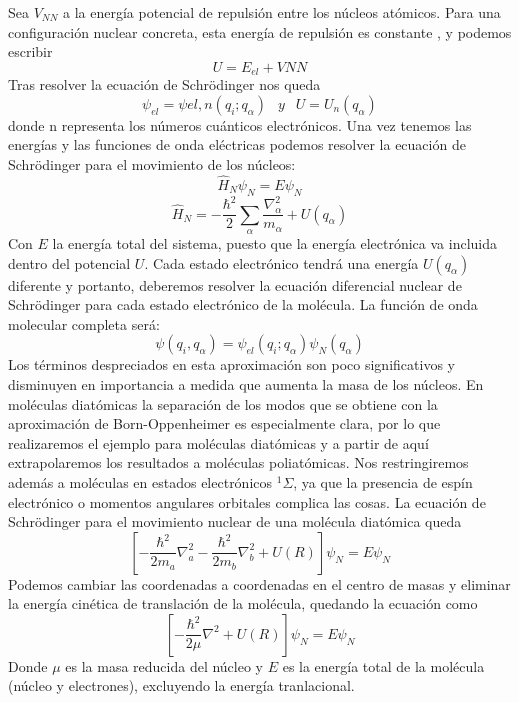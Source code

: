 \documentclass[a4paper]{article}
\begin{document}
Sea $V_{NN}$ a la energía potencial de repulsión entre los núcleos atómicos. Para una configuración nuclear concreta, esta energía de repulsión es constante , y podemos escribir 
\begin{equation}
U=E_{el}+V{NN}
\end{equation}
Tras resolver la ecuación de Schrödinger nos queda 
\begin{equation}
\psi_{el}=\psi{el,n}(q_i;q_\alpha)\,\ \,\ y \,\ \,\ U=U_n(q_\alpha)
\end{equation}
donde n representa los números cuánticos electrónicos.
Una vez tenemos las energías y las funciones de onda eléctricas podemos resolver la ecuación de Schrödinger para el movimiento de los núcleos:
\begin{equation}
\hat H_N\psi_N=E\psi_N
\end{equation}
\begin{equation}
\hat H_N=-\frac{\hbar^2}{2}\sum_\alpha \frac{\nabla^2_\alpha}{m_\alpha}+U(q_\alpha)
\end{equation}
Con $E$ la energía total del sistema, puesto que la energía electrónica va incluida dentro del potencial $U$. Cada estado electrónico tendrá una energía $U(q_\alpha)$ diferente y portanto, deberemos resolver la ecuación diferencial nuclear de Schrödinger para cada estado electrónico de la molécula.
La función de onda molecular completa será:
\begin{equation}
\psi(q_i,q_\alpha )=\psi_{el}(q_i;q_\alpha )\psi_N(q_\alpha )
\end{equation}
Los términos despreciados en esta aproximación son poco significativos y disminuyen en importancia a medida que aumenta la masa de los núcleos.
En moléculas diatómicas la separación de los modos que se obtiene con la aproximación de Born-Oppenheimer es especialmente clara, por lo que realizaremos el ejemplo para moléculas diatómicas y a partir de aquí extrapolaremos los resultados a moléculas poliatómicas. Nos restringiremos además a moléculas en estados electrónicos $^1\Sigma$, ya que la presencia de espín electrónico o momentos angulares orbitales complica las cosas.
La ecuación de Schrödinger para el movimiento nuclear de una molécula diatómica queda
\begin{equation}
\left[-\frac{\hbar^2}{2m_a}\nabla^2_a-\frac{\hbar^2}{2m_b}\nabla^2_b+U(R)\right]\psi_N=E\psi_N
\end{equation}
Podemos cambiar las coordenadas a coordenadas en el centro de masas y eliminar la energía cinética de translación de la molécula, quedando la ecuación como
\begin{equation}
\left[-\frac{\hbar^2}{2\mu}\nabla^2+U(R)\right]\psi_N=E\psi_N
\end{equation}
Donde $\mu$ es la masa reducida del núcleo y $E$ es la energía total de la molécula (núcleo y electrones), excluyendo la energía tranlacional.\\
\end{document}

